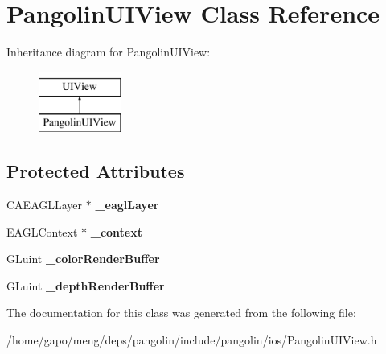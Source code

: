 \hypertarget{interface_pangolin_u_i_view}{}\section{Pangolin\+U\+I\+View Class Reference}
\label{interface_pangolin_u_i_view}
Inheritance diagram for Pangolin\+U\+I\+View\+:\begin{figure}[H]
\begin{center}
\leavevmode
\includegraphics[height=2.000000cm]{interface_pangolin_u_i_view}
\end{center}
\end{figure}
\subsection*{Protected Attributes}
\begin{DoxyCompactItemize}
\item 
C\+A\+E\+A\+G\+L\+Layer $\ast$ {\bfseries \+\_\+eagl\+Layer}\hypertarget{interface_pangolin_u_i_view_a12215e1b55f9948f45165f2e8bbfdad6}{}\label{interface_pangolin_u_i_view_a12215e1b55f9948f45165f2e8bbfdad6}

\item 
E\+A\+G\+L\+Context $\ast$ {\bfseries \+\_\+context}\hypertarget{interface_pangolin_u_i_view_a0389238054102910b994cf7c8cb7a94c}{}\label{interface_pangolin_u_i_view_a0389238054102910b994cf7c8cb7a94c}

\item 
G\+Luint {\bfseries \+\_\+color\+Render\+Buffer}\hypertarget{interface_pangolin_u_i_view_a8a0557e11f73f2a6716940659721f9ab}{}\label{interface_pangolin_u_i_view_a8a0557e11f73f2a6716940659721f9ab}

\item 
G\+Luint {\bfseries \+\_\+depth\+Render\+Buffer}\hypertarget{interface_pangolin_u_i_view_a1bab310bc19f9cc312e80c17ef737d8c}{}\label{interface_pangolin_u_i_view_a1bab310bc19f9cc312e80c17ef737d8c}

\end{DoxyCompactItemize}


The documentation for this class was generated from the following file\+:\begin{DoxyCompactItemize}
\item 
/home/gapo/meng/deps/pangolin/include/pangolin/ios/Pangolin\+U\+I\+View.\+h\end{DoxyCompactItemize}
